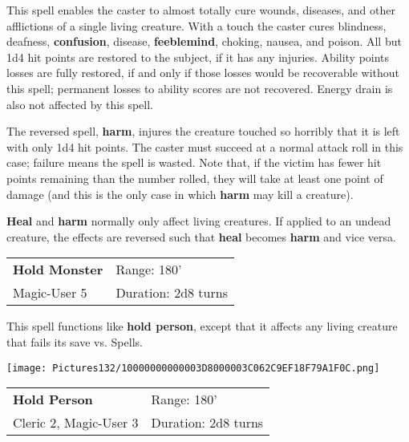 \documentclass[a4paper,twoside,openany,10pt]{book}
\begin{document}
\begin{multicols}{2}
This spell enables the caster to almost totally cure wounds, diseases, and other afflictions of a single living creature. With a touch the caster cures blindness, deafness, \textbf{confusion}, disease, \textbf{feeblemind}, choking, nausea, and poison. All but 1d4 hit points are restored to the subject, if it has any injuries. Ability points losses are fully restored, if and only if those losses would be recoverable without this spell; permanent losses to ability scores are not recovered. Energy drain is also not affected by this spell.

The reversed spell, \textbf{harm}, injures the creature touched so horribly that it is left with only 1d4 hit points. The caster must succeed at a normal attack roll in this case; failure means the spell is wasted. Note that, if the victim has fewer hit points remaining than the number rolled, they will take at least one point of damage (and this is the only case in which \textbf{harm} may kill a creature).

\textbf{Heal} and \textbf{harm} normally only affect living creatures. If applied to an undead creature, the effects are reversed such that \textbf{heal} becomes \textbf{harm} and vice versa.


\smallskip\begin{flushleft} 
	\begin{tabularx}{0.45\textwidth}{@{}m{3.5cm}m{5.5cm}@{}} 
		\textbf{Hold Monster} & Range: 180'\\
Magic-User 5 &Duration: 2d8 turns\\
	\end{tabularx}\end{flushleft}

This spell functions like \textbf{hold person}, except that it affects any living creature that fails its save vs. Spells.


\begin{flushleft}
	\texttt{[image: Pictures132/10000000000003D8000003C062C9EF18F79A1F0C.png]}
\end{flushleft}


\smallskip\begin{flushleft} 
	\begin{tabularx}{0.45\textwidth}{@{}m{3.5cm}m{5.5cm}@{}} 
		\textbf{Hold Person} & Range: 180'\\
Cleric 2, Magic-User 3 & Duration: 2d8 turns\\
	\end{tabularx}\end{flushleft}


\end{multicols}
\end{document}
